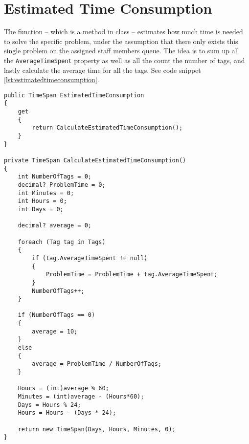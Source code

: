 \section{Estimated Time Consumption}
\label{sec:estimated_time_consumption}

The  function -- which is a method in  class -- estimates how much time is needed to solve the specific problem, under the assumption that there only exists this single problem on the assigned staff members queue. The idea is to sum up all the \verb+AverageTimeSpent+ property as well as all the count the number of tags, and lastly calculate the average time for all the tags. See code snippet \ref{lst:estimatedtimeconsumption}.

\begin{lstlisting}[style=sourceCode, caption=\myCaption{The ManageTagTimes method. In lines one to seven a property is shown, which wraps the method in lines nine to forty-three.}, label=lst:estimatedtimeconsumption]
public TimeSpan EstimatedTimeConsumption
{
    get
    {
        return CalculateEstimatedTimeConsumption();
    }
}

private TimeSpan CalculateEstimatedTimeConsumption()
{
    int NumberOfTags = 0;
    decimal? ProblemTime = 0;
    int Minutes = 0;
    int Hours = 0;
    int Days = 0;

    decimal? average = 0;

    foreach (Tag tag in Tags)
    {
        if (tag.AverageTimeSpent != null)
        {
            ProblemTime = ProblemTime + tag.AverageTimeSpent;
        }
        NumberOfTags++;
    }

    if (NumberOfTags == 0)
    {
        average = 10;
    }
    else
    {
        average = ProblemTime / NumberOfTags;
    }

    Hours = (int)average % 60;
    Minutes = (int)average - (Hours*60);
    Days = Hours % 24;
    Hours = Hours - (Days * 24);

    return new TimeSpan(Days, Hours, Minutes, 0);
}
\end{lstlisting}